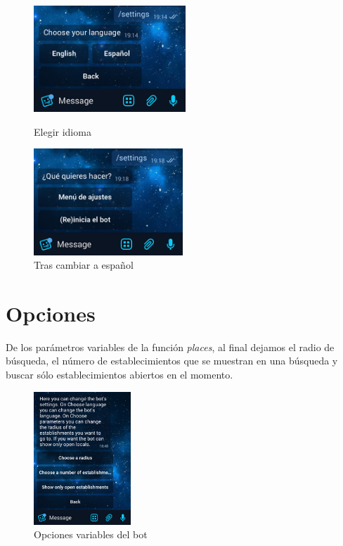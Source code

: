 \documentclass[oneside]{memoir}
\begin{document}
\begin{figure}[h!]
\centering
\begin{minipage}{6cm}
  \centering
  \includegraphics[height=40mm]{elegirIdioma.png}
  \caption{Elegir idioma}
  \label{fig:elegIdiom}
\end{minipage}%
\begin{minipage}{6cm}
  \centering
  \includegraphics[height=40mm]{esp.png}
  \caption{Tras cambiar a español}
  \label{fig:esi}
\end{minipage}
\end{figure}

\section{Opciones}
De los parámetros variables de la función \textit{places}, al final dejamos el radio de búsqueda, el número de establecimientos que se muestran en una búsqueda y buscar sólo establecimientos abiertos en el momento. 

\begin{figure}[h!]
  \centering
  \includegraphics[height=50mm]{parametros.png}
  \caption{Opciones variables del bot}
  \label{fig:parametros}
\end{figure}
\end{document}

